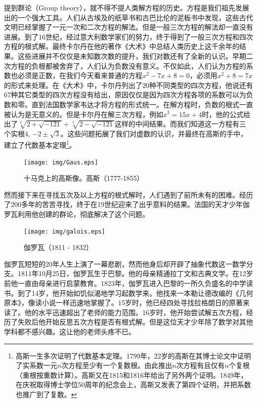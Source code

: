 \documentclass{article}
\begin{document}
提到群论（Group theory），就不得不提人类解方程的历史。方程是我们祖先发展出的一个强大工具。人们从古埃及的纸草书和古巴比伦的泥板书中发现，这些古代文明已经掌握了一元一次和二次方程的解法。但是一般三次方程的解法却一直没有进展。到了16世纪，经过意大利数学家们的努力，终于得到了一般三次方程和四次方程的根式解。最终卡尔丹在他的著作《大术》中总结人类历史上这千余年的结果。这些进展并不仅仅是未知数次数的提升，我们对数还有了全新的认识。早期二次方程的负根都被舍弃了，人们认为负数没有意义。不仅如此，人们认为方程的系数也必须是正数，在我们今天看来普通的方程$x^2 - 7x + 8 = 0$，必须用$x^2 + 8 = 7x$的形式来处理。在《大术》中，卡尔丹列出了20种不同类型的四次方程，他说还有67种其它类型的四次方程没有给出，原因仅仅是因为四次方程各项的系数可以为负数和零\cite{HanXueTao2012}。直到法国数学家韦达才将方程的形式统一。在解方程时，负数的根式一直被认为是无意义的。但是卡尔丹在解三次方程，例如$x^3 = 15x +4$时，他的公式给出了$\sqrt[3]{2 + \sqrt{-121}} + \sqrt[3]{2 - \sqrt{-121}}$这样的中间结果。而我们知道这一方程有三个实根4, $-2 \pm \sqrt{3}$。这些问题拓展了我们对虚数的认识，并最终在高斯的手中，建立了代数基本定理\footnote{高斯一生多次证明了代数基本定理。1799年，22岁的高斯在其博士论文中证明了实系数一元$n$次方程至少有一个复数根。由此推出$n$次方程有且仅有$n$个复根（重根按重数计算）。高斯又在1815和1816年给出了另外两个证明。1849年，在庆祝取得博士学位50周年的纪念会上，高斯又发表了第四个证明，并把系数也推广到了复数。}。

\begin{figure}[htbp]
 \centering
 \texttt{[image: img/Gaus.eps]}
 \captionsetup{labelformat=empty}
 \caption{十马克上的高斯像。高斯（1777-1855）}
 \label{fig:Gaus}
\end{figure}

然而接下来在寻找五次及以上方程的根式解时，人们遇到了前所未有的困难。经历了200多年的苦苦寻找，终于在19世纪迎来了出乎意料的结果。法国的天才少年伽罗瓦利用他创建的群论，彻底解决了这个问题。

\begin{figure}
 \centering
 \texttt{[image: img/galois.eps]}
 \captionsetup{labelformat=empty}
 \caption{伽罗瓦（1811 - 1832）}
 \label{fig:Galois}
\end{figure}

伽罗瓦短短的20年人生上演了一幕悲剧，然而他身后却开辟了抽象代数这一数学分支。1811年10月25日，伽罗瓦生于巴黎。他的母亲精通拉丁文和古典文学。在12岁前他一直由母亲进行启蒙教育。1823年，伽罗瓦进入巴黎的一所久负盛名的中学读书。到了14岁，他开始如饥似渴地学习起数学来。他找来一本勒让德改编的《几何原本》，像读小说一样迅速地掌握了。15岁时，他已经四处寻找拉格朗日的原著来读了。他的水平迅速超出了老师的能力范围。16岁时，他开始尝试解五次方程，经历了失败后他开始反思五次方程是否有根式解。但是这位天才少年除了数学对其他学科都不感兴趣。这让他的老师头疼不已。
\end{document}
